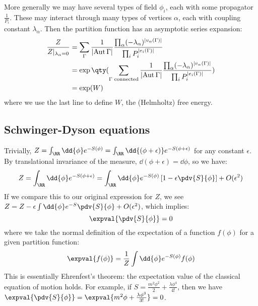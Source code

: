 \documentclass{jknotes}
\begin{document}
More generally we may have several types of field \(\phi_i\), each with some propagator \(\frac{1}{P_i}\). These may interact through many types of vertices \(\alpha\), each with coupling constant \(\lambda_\alpha\). Then the partition function has an asymptotic series expansion:
\begin{align}
    \frac{Z}{Z|_{\lambda_\alpha=0}} &= 
    \sum_\Gamma \frac{1}{|\text{Aut}\,\Gamma|}\frac{\prod_\alpha(-\lambda_\alpha)^{|v_\alpha(\Gamma)|}}{\prod_i P_i^{|e_i(\Gamma)|}} \\
    &= \exp \qty( \sum_{\Gamma\text{ connected}} \frac{1}{|\text{Aut}\,\Gamma|}\frac{\prod_\alpha(-\lambda_\alpha)^{|v_\alpha(\Gamma)|}}{\prod_i P_i^{|e_i(\Gamma)|}} ) \\
    &= \exp(W)
\end{align}
where we use the last line to define \(W\), the (Helmholtz) free energy.

\subsection{Schwinger-Dyson equations}
Trivially, \(Z = \int_\RR\dd{\phi}e^{-S(\phi)} = \int_\RR\dd{(\phi+\epsilon)}e^{-S(\phi+\epsilon)}\) for any constant \(\epsilon\). By translational invariance of the measure, \(\dd{(\phi+\epsilon)} = \dd{\phi}\), so we have:
\begin{equation}
    Z = \int_\RR\dd{\phi}e^{-S(\phi+\epsilon)} = \int_\RR\dd{\phi}e^{-S(\phi)}\left[ 1 - \epsilon\pdv{S}{\phi} \right] + O(\epsilon^2)
\end{equation}
If we compare this to our original expression for \(Z\), we see \(Z = Z - \epsilon\int\dd{\phi}e^{-S}\pdv{S}{\phi}+O(\epsilon^2)\), which implies:
\begin{equation}
    \expval{\pdv{S}{\phi}} = 0
\end{equation}
where we take the normal definition of the expectation of a function \(f(\phi)\) for a given partition function:
\begin{equation}
    \expval{f(\phi)} = \frac{1}{Z}\int\dd{\phi}e^{-S(\phi)}f(\phi)
\end{equation}
This is essentially Ehrenfest's theorem: the expectation value of the classical equation of motion holds. For example, if \(S=\frac{m^2\phi^2}{2} + \frac{\lambda\phi^4}{4!}\), then we have \(\expval{\pdv{S}{\phi}} = \expval{m^2\phi+\frac{\lambda\phi^3}{3!}} = 0\).
\end{document}
